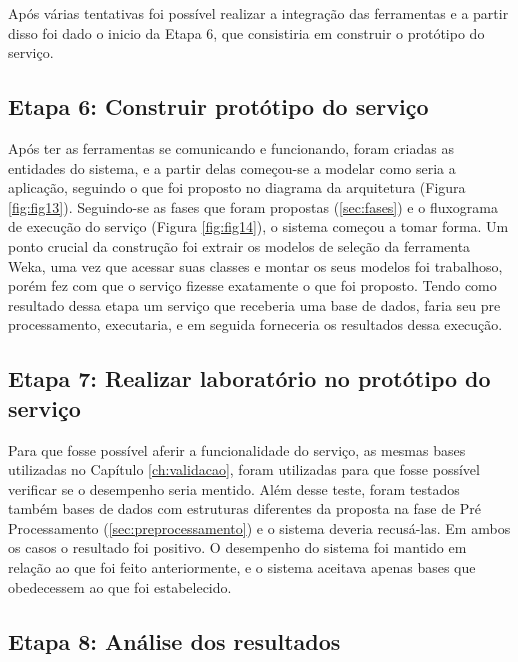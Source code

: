 Após várias tentativas foi possível realizar a integração das ferramentas e a partir disso foi dado o inicio da Etapa 6, que consistiria em construir o protótipo do serviço.

\subsection{Etapa 6: Construir protótipo do serviço}

Após ter as ferramentas se comunicando e funcionando, foram criadas as entidades do sistema, e a partir delas começou-se a modelar como seria a aplicação, seguindo o que foi proposto no diagrama da arquitetura (Figura \ref{fig:fig13}). Seguindo-se as fases que foram propostas (\ref{sec:fases}) e o fluxograma de execução do serviço (Figura \ref{fig:fig14}), o sistema começou a tomar forma. Um ponto crucial da construção foi extrair os modelos de seleção da ferramenta Weka, uma vez que acessar suas classes e montar os seus modelos foi trabalhoso, porém fez com que o serviço fizesse exatamente o que foi proposto. Tendo como resultado dessa etapa um serviço que receberia uma base de dados, faria seu pre processamento, executaria, e em seguida forneceria os resultados dessa execução.


\subsection{Etapa 7: Realizar laboratório no protótipo do serviço}

Para que fosse possível aferir a funcionalidade do serviço, as mesmas bases utilizadas no Capítulo \ref{ch:validacao}, foram utilizadas para que fosse possível verificar se o desempenho seria mentido. Além desse teste, foram testados também bases de dados com estruturas diferentes da proposta na fase de Pré Processamento (\ref{sec:preprocessamento}) e o sistema deveria recusá-las. Em ambos os casos o resultado foi positivo. O desempenho do sistema foi mantido em relação ao que foi feito anteriormente, e o sistema aceitava apenas bases que obedecessem ao que foi estabelecido.

\subsection{Etapa 8: Análise dos resultados}